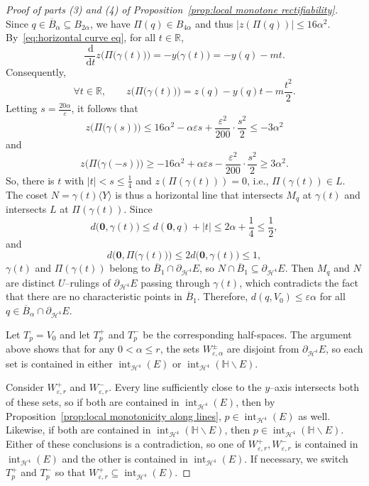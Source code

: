 \documentclass[11pt,reqno]{amsart}
\renewcommand{\H}{\mathbb{H}}
\newcommand{\R}{\mathbb{R}}
\newcommand{\cH}{\mathcal{H}}
\renewcommand{\epsilon}{\varepsilon}
\newcommand{\ud}[0]{\,\mathrm{d}}
\newcommand{\0}{\mathbf{0}}
\renewcommand{\1}{\mathbf 1}
\renewcommand{\subset}{\subseteq}
\renewcommand{\ge}{\geqslant}
\renewcommand{\le}{\leqslant}
\renewcommand{\setminus}{\smallsetminus}
\theoremstyle{remark}
\DeclareMathOperator{\inter}{int}
\begin{document}
\begin{proof}[{Proof of parts (3) and (4) of Proposition~\ref{prop:local monotone rectifiability}}]
  Since $q\in \overline{B}_{\alpha}\subset B_{2\alpha}$, we have $\Pi(q)\in B_{4\alpha}$ and thus $|z(\Pi(q))|\le 16\alpha^2$.  By~\eqref{eq:horizontal curve eq}, for all $t\in \R$,
  $$\frac{\ud}{\ud t} z\Big(\Pi\big(\gamma(t)\big)\Big) = - y\big(\gamma(t)\big) = -y(q) - mt.$$
  Consequently,
  $$\forall t\in \R,\qquad z\Big(\Pi\big(\gamma(t)\big)\Big)=z(q) - y(q)t - m \frac{t^2}{2}.$$
  Letting $s=\frac{20\alpha}{ \epsilon}$, it follows that
  $$z\Big(\Pi\big(\gamma(s)\big)\Big)\le 16\alpha^2 - \alpha \epsilon s + \frac{\epsilon^2}{200}\cdot \frac{s^2}{2} \le -3\alpha^2$$
  and
  $$z\Big(\Pi\big(\gamma(-s)\big)\Big)\ge - 16\alpha^2 + \alpha \epsilon s - \frac{\epsilon^2}{200} \cdot \frac{s^2}{2} \ge 3\alpha^2.$$
So, there is $t$ with $|t|<s\le \frac{1}{4}$ and $z(\Pi(\gamma(t)))=0$, i.e., $\Pi(\gamma(t))\in L$.  The coset $N=\gamma(t) \langle Y\rangle$ is thus a horizontal line that intersects $M_q$ at $\gamma(t)$ and intersects $L$ at $\Pi(\gamma(t))$.  Since
  $$d\big(\mathbf{0},\gamma(t)\big)\le d(\mathbf{0},q)+|t| \le 2\alpha + \frac{1}{4}\le \frac{1}{2},$$
  and
  $$d\Big(\mathbf{0},\Pi\big(\gamma(t)\big)\Big)\le 2 d\big(\mathbf{0},\gamma(t)\big)\le 1,$$
  $\gamma(t)$ and $\Pi(\gamma(t))$ belong to  $\overline{B}_1\cap \partial_{\cH^4} E$, so $N\cap \overline{B}_1\subset \partial_{\cH^4} E$.  Then $M_q$ and $N$ are distinct $U$--rulings of $\partial_{\cH^4} E$ passing through $\gamma(t)$, which contradicts the fact that there are no characteristic points in $\overline{B}_1$.  Therefore, $d(q,V_0)\le \epsilon \alpha$ for all $q\in \overline{B}_{\alpha}\cap \partial_{\cH^4} E$.

  Let $T_p=V_0$ and let $T_p^+$ and $T_p^-$ be the corresponding half-spaces.  The argument above shows that for any $0<\alpha \le r$, the sets $W_{\epsilon,\alpha}^\pm$ are disjoint from $\partial_{\cH^4} E$, so each set is contained in either $\inter_{\cH^4} (E)$ or $\inter_{\cH^4} (\H\setminus E)$.

  Consider $W_{\epsilon,r}^+$ and $W_{\epsilon,r}^-$.  Every line sufficiently close to the $y$--axis intersects both of these sets, so if both are contained in $\inter_{\cH^4} (E)$, then by Proposition~\ref{prop:local monotonicity along lines}, $p\in \inter_{\cH^4} (E)$ as well.  Likewise, if both are contained in $\inter_{\cH^4} (\H\setminus E)$, then $p\in \inter_{\cH^4} (\H\setminus E)$.  Either of these conclusions  is a contradiction, so one of $W_{\epsilon,r}^+,W_{\epsilon,r}^-$ is contained in $\inter_{\cH^4}(E)$ and the other is contained in $\inter_{\cH^4} (E)$.  If necessary, we switch $T_p^+$ and $T_p^-$ so that $W^+_{\epsilon,r}\subset \inter_{\cH^4} (E)$.


\end{proof}
\end{document}
